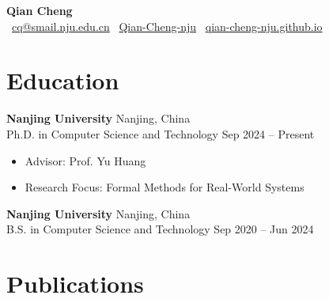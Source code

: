 \documentclass[11pt,a4paper]{article}
\newcommand{\cvitem}[2]{
    \textbf{#1} \hfill #2
}
\begin{document}
\begin{center}
    {\LARGE \textbf{Qian Cheng}}\\[4pt]
    \faEnvelope\ \href{mailto:cq@smail.nju.edu.cn}{cq@smail.nju.edu.cn} \quad
    \faGithub\ \href{https://github.com/Qian-Cheng-nju}{Qian-Cheng-nju} \quad
    \faGlobe\ \href{https://qian-cheng-nju.github.io}{qian-cheng-nju.github.io}
\end{center}

\section{Education}

\cvitem{Nanjing University}{Nanjing, China}\\
Ph.D. in Computer Science and Technology \hfill Sep 2024 -- Present
\begin{itemize}[leftmargin=*, nosep, topsep=2pt]
    \item Advisor: Prof. Yu Huang
    \item Research Focus: Formal Methods for Real-World Systems
\end{itemize}

\vspace{6pt}

\cvitem{Nanjing University}{Nanjing, China}\\
B.S. in Computer Science and Technology \hfill Sep 2020 -- Jun 2024

\section{Publications}
\end{document}
